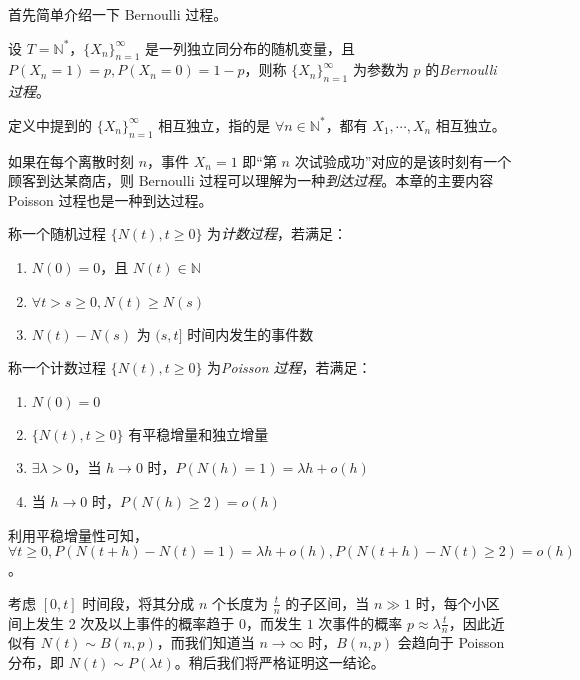\documentclass[../main.tex]{subfiles}
\begin{document}
首先简单介绍一下 Bernoulli 过程。

\begin{definition}\label{def:6.1.1}
    设 $T=\mathbb N^*$，$\{X_n\}_{n=1}^\infty$ 是一列独立同分布的随机变量，且 $P(X_n=1)=p,P(X_n=0)=1-p$，则称 $\{X_n\}_{n=1}^\infty$ 为参数为 $p$ 的\emph{Bernoulli 过程}。
\end{definition}

定义中提到的 $\{X_n\}_{n=1}^\infty$ 相互独立，指的是 $\forall n\in\mathbb N^*$，都有 $X_1,\cdots,X_n$ 相互独立。

如果在每个离散时刻 $n$，事件 $X_n=1$ 即“第 $n$ 次试验成功”对应的是该时刻有一个顾客到达某商店，则 Bernoulli 过程可以理解为一种\emph{到达过程}。本章的主要内容 Poisson 过程也是一种到达过程。

\begin{definition}\label{def:6.1.2}
    称一个随机过程 $\{N(t),t\geq0\}$ 为\emph{计数过程}，若满足：
    \begin{enumerate}
        \item $N(0)=0$，且 $N(t)\in\mathbb N$
        \item $\forall t>s\geq0,N(t)\geq N(s)$
        \item $N(t)-N(s)$ 为 $(s,t]$ 时间内发生的事件数
    \end{enumerate}
\end{definition}

\begin{definition}\label{def:6.1.3}
    称一个计数过程 $\{N(t),t\geq0\}$ 为\emph{Poisson 过程}，若满足：
    \begin{enumerate}
        \item $N(0)=0$
        \item $\{N(t),t\geq0\}$ 有平稳增量和独立增量
        \item $\exists\lambda>0$，当 $h\rightarrow0$ 时，$P(N(h)=1)=\lambda h+o(h)$
        \item 当 $h\rightarrow0$ 时，$P(N(h)\geq2)=o(h)$
    \end{enumerate}
\end{definition}

利用平稳增量性可知，$\forall t\geq0,P(N(t+h)-N(t)=1)=\lambda h+o(h),P(N(t+h)-N(t)\geq2)=o(h)$。

考虑 $[0,t]$ 时间段，将其分成 $n$ 个长度为 $\frac tn$ 的子区间，当 $n\gg1$ 时，每个小区间上发生 $2$ 次及以上事件的概率趋于 $0$，而发生 $1$ 次事件的概率 $p\approx \lambda\frac tn$，因此近似有 $N(t)\sim B(n,p)$，而我们知道当 $n\rightarrow\infty$ 时，$B(n,p)$ 会趋向于 Poisson 分布，即 $N(t)\sim P(\lambda t)$。稍后我们将严格证明这一结论。
\end{document}
